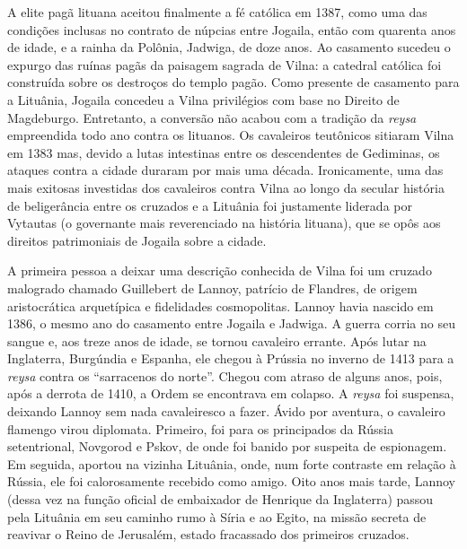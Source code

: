 A elite pagã lituana aceitou finalmente a fé católica em 1387, como uma
das condições inclusas no contrato de núpcias entre Jogaila, então com
quarenta anos de idade, e a rainha da Polônia, Jadwiga, de doze anos. Ao
casamento sucedeu o expurgo das ruínas pagãs da paisagem sagrada de
Vilna: a catedral católica foi construída sobre os destroços do templo
pagão. Como presente de casamento para a Lituânia, Jogaila concedeu a
Vilna privilégios com base no Direito de Magdeburgo. Entretanto, a
conversão não acabou com a tradição da \emph{reysa} empreendida todo ano
contra os lituanos. Os cavaleiros teutônicos sitiaram Vilna em 1383 mas,
devido a lutas intestinas entre os descendentes de Gediminas, os ataques
contra a cidade duraram por mais uma década. Ironicamente, uma das mais
exitosas investidas dos cavaleiros contra Vilna ao longo da secular
história de beligerância entre os cruzados e a Lituânia foi justamente
liderada por Vytautas (o governante mais reverenciado na história
lituana), que se opôs aos direitos patrimoniais de Jogaila sobre a
cidade.

A primeira pessoa a deixar uma descrição conhecida de Vilna foi um
cruzado malogrado chamado Guillebert de Lannoy, patrício de Flandres, de
origem aristocrática arquetípica e fidelidades cosmopolitas. Lannoy
havia nascido em 1386, o mesmo ano do casamento entre Jogaila e Jadwiga.
A guerra corria no seu sangue e, aos treze anos de idade, se tornou
cavaleiro errante. Após lutar na Inglaterra, Burgúndia e Espanha, ele
chegou à Prússia no inverno de 1413 para a \emph{reysa} contra os
``sarracenos do norte''. Chegou com atraso de alguns anos, pois, após a
derrota de 1410, a Ordem se encontrava em colapso. A \emph{reysa} foi
suspensa, deixando Lannoy sem nada cavaleiresco a fazer. Ávido por
aventura, o cavaleiro flamengo virou diplomata. Primeiro, foi para os
principados da Rússia setentrional, Novgorod e Pskov, de onde foi banido
por suspeita de espionagem. Em seguida, aportou na vizinha Lituânia,
onde, num forte contraste em relação à Rússia, ele foi calorosamente
recebido como amigo. Oito anos mais tarde, Lannoy (dessa vez na função
oficial de embaixador de Henrique  da Inglaterra) passou pela Lituânia
em seu caminho rumo à Síria e ao Egito, na missão secreta de reavivar o
Reino de Jerusalém, estado fracassado dos primeiros cruzados.

